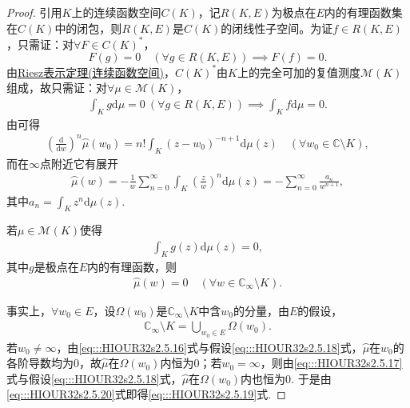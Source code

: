 \documentclass[../../main.tex]{subfiles}%
\begin{document}
\begin{proof}
引用$K$上的连续函数空间$C(K)$，记$R(K,E)$为极点在$E$内的有理函数集在$C(K)$中的闭包，则$R(K,E)$是$C(K)$的闭线性子空间。为证$f\in R(K,E)$，只需证：对$\forall F\in C(K)^*$，
\[
F(g)=0\quad (\forall g\in R(K,E))\implies F(f)=0.
\]
由\hyperref[theorem:泛函分析--Riesz表示定理连续函数空间]{Riesz表示定理(连续函数空间)}，$C(K)^*$由$K$上的完全可加的复值测度$\mathscr{M}(K)$组成，故只需证：对$\forall \mu\in\mathscr{M}(K)$，
\begin{align}
\int_{K}g\mathrm{d}\mu=0\ (\forall g\in R(K,E))\implies \int_{K}f\mathrm{d}\mu=0. \label{eq:::HIOUR32s2.5.15}
\end{align}
由可得
\begin{align}
\left(\frac{\mathrm{d}}{\mathrm{d}w}\right)^n\wideparen{\mu}(w_0)=n!\int_{K}(z-w_0)^{-n+1}\mathrm{d}\mu(z)\quad (\forall w_0\in\mathbb{C}\setminus K), \label{eq:::HIOUR32s2.5.16}
\end{align}
而在$\infty$点附近它有展开
\begin{align}
\wideparen{\mu}(w)=-\frac{1}{w}\sum\limits_{n=0}^{\infty}\int_{K}\left(\frac{z}{w}\right)^n\mathrm{d}\mu(z)=-\sum\limits_{n=0}^{\infty}\frac{a_n}{w^{n+1}}, \label{eq:::HIOUR32s2.5.17}
\end{align}
其中$a_n=\int_{K}z^n\mathrm{d}\mu(z)$.

若$\mu\in\mathscr{M}(K)$使得
\begin{align}
\int_{K}g(z)\mathrm{d}\mu(z)=0, \label{eq:::HIOUR32s2.5.18}
\end{align}
其中$g$是极点在$E$内的有理函数，则
\begin{align}
\wideparen{\mu}(w)=0\quad (\forall w\in\mathbb{C}_\infty\setminus K). \label{eq:::HIOUR32s2.5.19}
\end{align}

事实上，$\forall w_0\in E$，设$\Omega(w_0)$是$\mathbb{C}_\infty\setminus K$中含$w_0$的分量，由$E$的假设，
\begin{align}
\mathbb{C}_\infty\setminus K=\bigcup\limits_{w_0\in E}\Omega(w_0). \label{eq:::HIOUR32s2.5.20}
\end{align}
若$w_0\neq\infty$，由\eqref{eq:::HIOUR32s2.5.16}式与假设\eqref{eq:::HIOUR32s2.5.18}式，$\wideparen{\mu}$在$w_0$的各阶导数均为$0$，故$\wideparen{\mu}$在$\Omega(w_0)$内恒为$0$；若$w_0=\infty$，则由\eqref{eq:::HIOUR32s2.5.17}式与假设\eqref{eq:::HIOUR32s2.5.18}式，$\wideparen{\mu}$在$\Omega(w_0)$内也恒为$0$. 于是由\eqref{eq:::HIOUR32s2.5.20}式即得\eqref{eq:::HIOUR32s2.5.19}式.


\end{proof}
\end{document}
